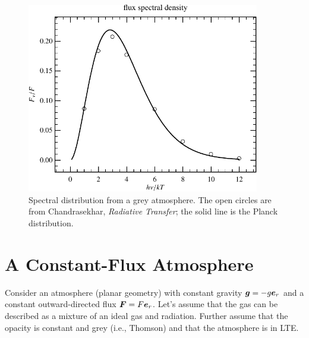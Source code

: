 \begin{figure}[htbp]
\includegraphics[width=4in]{plots_out/spectral_distribution}
\caption{\label{f.spectral} Spectral distribution from a grey atmosphere. The open circles are from Chandrasekhar, \emph{Radiative Transfer}; the solid line is the Planck distribution.}
\end{figure}

\section{A Constant-Flux Atmosphere}

Consider an atmosphere (planar geometry) with constant gravity $\boldsymbol{g} = -g \boldsymbol{e}_{r}$ and a constant outward-directed flux $\boldsymbol{F} = F\boldsymbol{e}_{r}$. Let's assume that the gas can be described as a mixture of an ideal gas and radiation.  Further assume that the opacity is constant and grey (i.e., Thomson) and that the atmosphere is in LTE.

